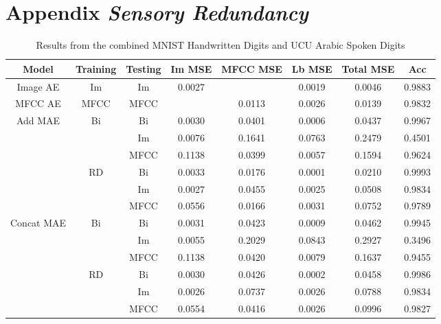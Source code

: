 \chapter{Appendix \emph{Sensory Redundancy}}
\label{appendix:A}

\begin{landscape}
\begin{table}[p]
\centering
		\begin{tabular}{|c|c|c|c|c|c|c|c|}
		\hline
		Model & Training & Testing & Im MSE & MFCC MSE & Lb MSE & Total MSE & Acc \\
		\hline
		Image AE & Im & Im & 0.0027	&	&0.0019	& 0.0046	&	0.9883\\ \hline
		MFCC AE & MFCC & MFCC & 	&0.0113	&	0.0026	&	0.0139	& 0.9832\\ \hline
		\multirow{6}{*}{Add MAE} & \multirow{3}{*}{Bi} & Bi &	0.0030	&	0.0401	&	0.0006	&	0.0437	&0.9967\\ \cline{3-8}
		&& Im &	0.0076	&	0.1641	&	0.0763	&	0.2479	&0.4501 \\ \cline{3-8}
		&& MFCC &	0.1138	&	0.0399	&	0.0057	&	0.1594	&0.9624 \\ \cline{2-8}
		& \multirow{3}{*}{RD} & Bi&	0.0033	&	0.0176	&	0.0001	&	0.0210	& 0.9993 \\ \cline{3-8}
		&& Im &	0.0027	&	0.0455	&	0.0025	&	0.0508	& 0.9834\\ \cline{3-8}
		&& MFCC & 0.0556	&	0.0166	&	0.0031	&	0.0752	&	0.9789 \\ \hline
		
		\multirow{6}{*}{Concat MAE} & \multirow{3}{*}{Bi} & Bi &	0.0031	&	0.0423	&	0.0009	& 0.0462	&	0.9945 \\ \cline{3-8}
		&& Im &	0.0055	&	0.2029	&	0.0843	&	0.2927	&	0.3496 \\ \cline{3-8}
		&& MFCC &0.1138	&	0.0420	&	0.0079	&0.1637	&	0.9455 \\ \cline{2-8}
		& \multirow{3}{*}{RD} & Bi &	0.0030	&	0.0426	&	0.0002	&	0.0458	&0.9986 \\ \cline{3-8}
		&& Im &	0.0026	&	0.0737	&	0.0026	& 0.0788	&	0.9834
\\ \cline{3-8}
		&& MFCC &	0.0554	&	0.0416	&	0.0026	&	0.0996	&0.9827
 \\ \hline
		\end{tabular}
		\caption{Results from the combined MNIST Handwritten Digits and UCU Arabic Spoken Digits}
		\label{tab:mnist_ucu_master_res}
\end{table}		
\end{landscape}	

